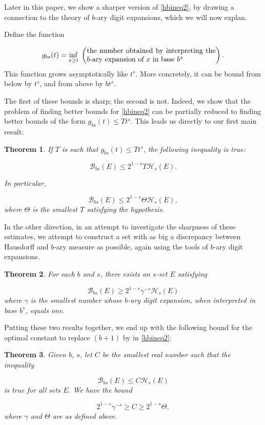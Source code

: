 \documentclass[11pt, reqno]{amsart}
\newcommand{\HH}{\mathcal{H}}
\newcommand{\BB}{\mathcal{B}}
\newtheorem{theorem}{Theorem}
\begin{document}
Later in this paper, we show a sharper version of \eqref{hbineq2}, by drawing a connection to the theory of $b$-ary digit expansions, which we will now explan. 

Define the function

\[ g_{bs} (t) = \inf_{x \geq t}\;\left(\parbox{18em}{the number obtained by interpreting the $b$-ary expansion of $x$ in base $b^s$}\right).\]
This function grows asymptotically like $t^s$. More concretely, it can be bound from below by $t^s$, and from above by $b t^s$.

The first of these bounds is sharp; the second is not. Indeed, we show that the problem of finding better bounds for \eqref{hbineq2} can be partially reduced to finding better bounds of the form $g_{bs}(t) \leq T t^s$. This leads us directly to our first main result:

\begin{theorem}
If $T$ is such that $g_{bs}(t) \leq T t^s$, the following inequality is true:

\[\BB_{bs}(E) \leq 2^{1-s} T \HH_s(E).\]

In particular,

\[\BB_{bs}(E) \leq 2^{1-s} \Theta \HH_s(E),\]
where $\Theta$ is the smallest $T$ satisfying the hypothesis.
\end{theorem}

In the other direction, in an attempt to investigate the sharpness of these estimates, we attempt to construct a set with as big a discrepancy between Hausdorff and $b$-ary measure as possible, again using the tools of $b$-ary digit expansions.

\begin{theorem}\label{clowerbound}
For each $b$ and $s$, there exists an $s$-set $E$ satisfying

\[\BB_{bs}(E) \geq 2^{1-s} \gamma^{-s} \HH_s(E)\]
where $\gamma$ is the smallest number whose $b$-ary digit expansion, when interpreted in base $b^s$, equals one.
\end{theorem}

Putting these two results together, we end up with the following bound for the optimal constant to replace $(b+1)$ by in \eqref{hbineq2}:

\begin{theorem}\label{cbounds}
Given $b$, $s$, let $C$ be the smallest real number such that the inequality

\[\BB_{bs}(E) \leq C \HH_s(E)\]
is true for all sets $E$. We have the bound

\[2^{1-s} \gamma^{-s} \geq C \geq 2^{1-s} \Theta,\]
where $\gamma$ and $\Theta$ are as defined above.
\end{theorem}
\end{document}
